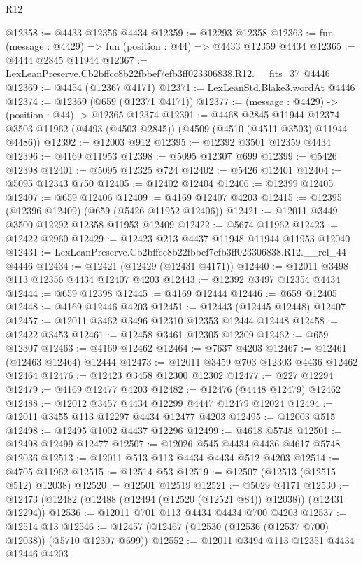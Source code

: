 \begin{lexlean}{R12}
\begin{coremodule}
@12358 := @4433 @12356 @4434
@12359 := @12293 @12358
@12363 := fun (message : @4429) => fun (position : @44) => @4433 @12359 @4434
@12365 := @4444 @2845 @11944
@12367 := LexLeanPreserve.Cb2bffcc8b22fbbef7efb3ff023306838.R12.__fits_37 @4446
@12369 := @4454 (@12367 @4171)
@12371 := LexLeanStd.Blake3.wordAt @4446
@12374 := @12369 (@659 (@12371 @4171))
@12377 := (message : @4429) -> (position : @44) -> @12365 @12374
@12391 := @4468
    @2845
    @11944
    @12374
    @3503
    @11962
    (@4493 (@4503 @2845))
    (@4509 (@4510 (@4511 @3503) @11944 @4486))
@12392 := @12003 @912
@12395 := @12392 @3501 @12359 @4434
@12396 := @4169 @11953
@12398 := @5095 @12307 @699
@12399 := @5426 @12398
@12401 := @5095 @12325 @724
@12402 := @5426 @12401
@12404 := @5095 @12343 @750
@12405 := @12402 @12404
@12406 := @12399 @12405
@12407 := @659 @12406
@12409 := @4169 @12407 @4203
@12415 := @12395 (@12396 @12409) (@659 (@5426 @11952 @12406))
@12421 := @12011 @3449 @3500 @12292 @12358 @11953 @12409
@12422 := @5674 @11962
@12423 := @12422 @2960
@12429 := @12423 @213 @4437 @11948 @11944 @11953 @12040
@12431 := LexLeanPreserve.Cb2bffcc8b22fbbef7efb3ff023306838.R12.__rel_44 @4446
@12434 := @12421 (@12429 (@12431 @4171))
@12440 := @12011 @3498 @113 @12356 @4434 @12407 @4203
@12443 := @12392 @3497 @12354 @4434
@12444 := @659 @12398
@12445 := @4169 @12444
@12446 := @659 @12405
@12448 := @4169 @12446 @4203
@12451 := @12443 (@12445 @12448) @12407
@12457 := @12011 @3462 @3496 @12310 @12353 @12444 @12448
@12458 := @12422 @3453
@12461 := @12458 @3461 @12305 @12309
@12462 := @659 @12307
@12463 := @4169 @12462
@12464 := @7637 @4203
@12467 := @12461 (@12463 @12464) @12444
@12473 := @12011 @3459 @703 @12303 @4436 @12462 @12464
@12476 := @12423 @3458 @12300 @12302
@12477 := @227 @12294
@12479 := @4169 @12477 @4203
@12482 := @12476 (@4448 @12479) @12462
@12488 := @12012 @3457 @4434 @12299 @4447 @12479 @12024
@12494 := @12011 @3455 @113 @12297 @4434 @12477 @4203
@12495 := @12003 @515
@12498 := @12495 @1002 @4437 @12296
@12499 := @4618 @5748
@12501 := @12498 @12499 @12477
@12507 := @12026 @545 @4434 @4436 @4617 @5748 @12036
@12513 := @12011 @513 @113 @4434 @4434 @512 @4203
@12514 := @4705 @11962
@12515 := @12514 @53
@12519 := @12507 (@12513 (@12515 @512) @12038)
@12520 := @12501 @12519
@12521 := @5029 @4171
@12530 := @12473 (@12482 (@12488 (@12494 (@12520 (@12521 @84)) @12038)) (@12431 @12294))
@12536 := @12011 @701 @113 @4434 @4434 @700 @4203
@12537 := @12514 @13
@12546 := @12457 (@12467 (@12530 (@12536 (@12537 @700) @12038)) (@5710 @12307 @699))
@12552 := @12011 @3494 @113 @12351 @4434 @12446 @4203

\end{coremodule}
\end{lexlean}
